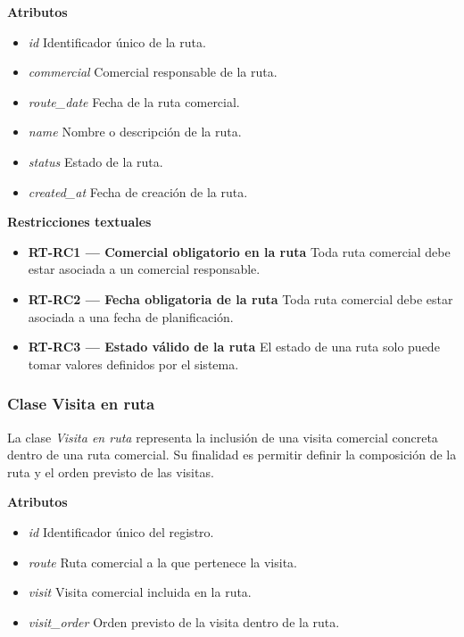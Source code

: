 \textbf{Atributos}

\begin{itemize}
      \item \textit{id} Identificador único de la ruta.
      \item \textit{commercial} Comercial responsable de la ruta.
      \item \textit{route\_date} Fecha de la ruta comercial.
      \item \textit{name} Nombre o descripción de la ruta.
      \item \textit{status} Estado de la ruta.
      \item \textit{created\_at} Fecha de creación de la ruta.
\end{itemize}

\textbf{Restricciones textuales}

\begin{itemize}
      \item \textbf{RT-RC1 — Comercial obligatorio en la ruta} Toda ruta comercial debe estar asociada a un comercial responsable.
      \item \textbf{RT-RC2 — Fecha obligatoria de la ruta} Toda ruta comercial debe estar asociada a una fecha de planificación.
      \item \textbf{RT-RC3 — Estado válido de la ruta} El estado de una ruta solo puede tomar valores definidos por el sistema.
\end{itemize}

\subsubsection{Clase Visita en ruta}

La clase \textit{Visita en ruta} representa la inclusión de una visita comercial concreta dentro de una ruta comercial. Su finalidad es permitir definir la composición de la ruta y el orden previsto de las visitas.

\textbf{Atributos}

\begin{itemize}
      \item \textit{id} Identificador único del registro.
      \item \textit{route} Ruta comercial a la que pertenece la visita.
      \item \textit{visit} Visita comercial incluida en la ruta.
      \item \textit{visit\_order} Orden previsto de la visita dentro de la ruta.
\end{itemize}

